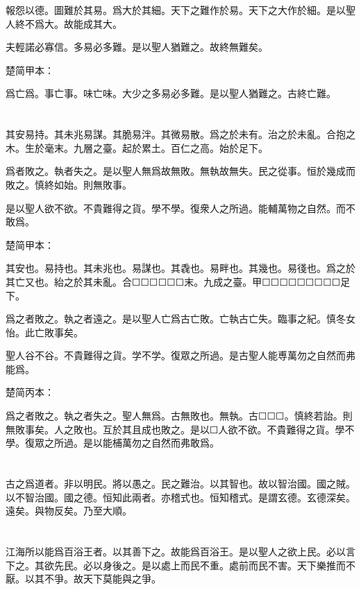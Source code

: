 \documentclass[a5paper]{ctexbook}
\begin{document}
    報怨以德。圖難於其易。爲大於其細。天下之難作於易。天下之大作於細。是以聖人終不爲大。故能成其大。

    夫輕諾必寡信。多易必多難。是以聖人猶難之。故終無難矣。

    楚简甲本：

    爲亡爲。事亡事。味亡味。大少之多易必多難。是以聖人猶難之。古終亡難。

    \chapter{}

    其安易持。其未兆易謀。其脆易泮。其微易散。爲之於未有。治之於未亂。合抱之木。生於毫末。九層之臺。起於累土。百仁之高。始於足下。

    爲者敗之。執者失之。是以聖人無爲故無敗。無執故無失。民之從事。恒於幾成而敗之。慎終如始。則無敗事。

    是以聖人欲不欲。不貴難得之貨。學不學。復衆人之所過。能輔萬物之自然。而不敢爲。

    楚简甲本：

    其安也。易持也。其未兆也。易謀也。其毳也。易畔也。其幾也。易㣤也。爲之於其亡又也。紿之於其未亂。合☐☐☐☐☐☐末。九成之臺。甲☐☐☐☐☐☐☐☐☐足下。

    爲之者敗之。執之者遠之。是以聖人亡爲古亡敗。亡執古亡失。臨事之紀。慎冬女怡。此亡敗事矣。

    聖人谷不谷。不貴難得之貨。学不学。復眾之所過。是古聖人能尃萬勿之自然而弗能爲。

    楚简丙本：

    爲之者敗之。執之者失之。聖人無爲。古無敗也。無執。古☐☐☐。慎終若詒。則無敗事矣。人之敗也。互於其且成也敗之。是以☐人欲不欲。不貴難得之貨。學不學。復眾之所過。是以能㭪萬勿之自然而弗敢爲。

    \chapter{}

    古之爲道者。非以明民。將以愚之。民之難治。以其智也。故以智治國。國之賊。以不智治國。國之德。恒知此兩者。亦稽式也。恒知稽式。是謂玄德。玄德深矣。遠矣。與物反矣。乃至大順。

    \chapter{}

    江海所以能爲百浴王者。以其善下之。故能爲百浴王。是以聖人之欲上民。必以言下之。其欲先民。必以身後之。是以處上而民不重。處前而民不害。天下樂推而不厭。以其不爭。故天下莫能與之爭。
\end{document}
